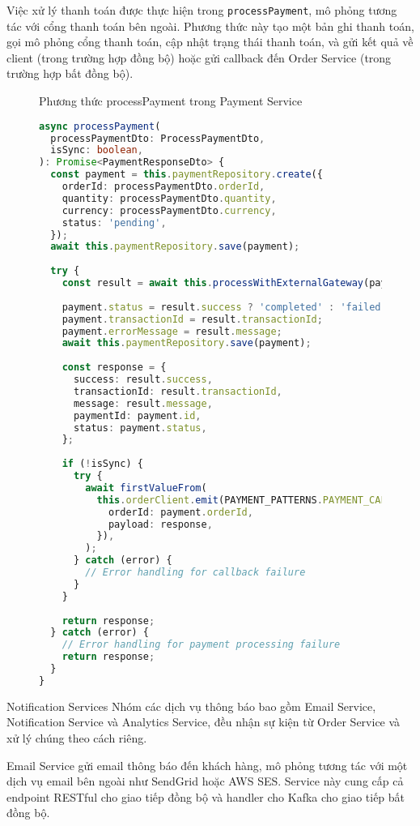 Việc xử lý thanh toán được thực hiện trong \texttt{processPayment}, mô phỏng tương tác với cổng thanh toán bên ngoài. Phương thức này tạo một bản ghi thanh toán, gọi mô phỏng cổng thanh toán, cập nhật trạng thái thanh toán, và gửi kết quả về client (trong trường hợp đồng bộ) hoặc gửi callback đến Order Service (trong trường hợp bất đồng bộ).

\begin{figure}[H]{Phương thức processPayment trong Payment Service}
  \centering
  \begin{lstlisting}[language=Typescript, basicstyle=\scriptsize\ttfamily]
async processPayment(
  processPaymentDto: ProcessPaymentDto,
  isSync: boolean,
): Promise<PaymentResponseDto> {
  const payment = this.paymentRepository.create({
    orderId: processPaymentDto.orderId,
    quantity: processPaymentDto.quantity,
    currency: processPaymentDto.currency,
    status: 'pending',
  });
  await this.paymentRepository.save(payment);
  
  try {
    const result = await this.processWithExternalGateway(payment);
    
    payment.status = result.success ? 'completed' : 'failed';
    payment.transactionId = result.transactionId;
    payment.errorMessage = result.message;
    await this.paymentRepository.save(payment);
    
    const response = {
      success: result.success,
      transactionId: result.transactionId,
      message: result.message,
      paymentId: payment.id,
      status: payment.status,
    };
    
    if (!isSync) {
      try {
        await firstValueFrom(
          this.orderClient.emit(PAYMENT_PATTERNS.PAYMENT_CALLBACK, {
            orderId: payment.orderId,
            payload: response,
          }),
        );
      } catch (error) {
        // Error handling for callback failure
      }
    }
    
    return response;
  } catch (error) {
    // Error handling for payment processing failure
    return response;
  }
}
  \end{lstlisting}
\end{figure}

Notification Services
Nhóm các dịch vụ thông báo bao gồm Email Service, Notification Service và Analytics Service, đều nhận sự kiện từ Order Service và xử lý chúng theo cách riêng.

Email Service gửi email thông báo đến khách hàng, mô phỏng tương tác với một dịch vụ email bên ngoài như SendGrid hoặc AWS SES. Service này cung cấp cả endpoint RESTful cho giao tiếp đồng bộ và handler cho Kafka cho giao tiếp bất đồng bộ.

